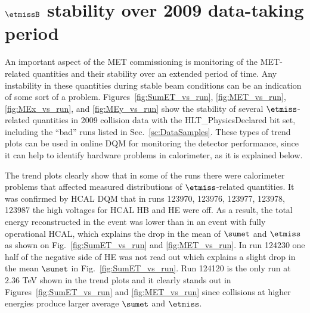 \section[$\etmiss$ stability over 2009 data-taking period]{$\etmissB$ stability over 2009 data-taking period}
\label{sc:METStab}

An important aspect of the MET commissioning is monitoring of the
MET-related quantities and their stability over an extended period of
time. Any instability in these quantities during stable beam conditions
can be an indication of some sort of a problem.
Figures~\ref{fig:SumET_vs_run}, \ref{fig:MET_vs_run},
\ref{fig:MEx_vs_run}, and \ref{fig:MEy_vs_run} show the stability of
several $\etmiss$-related quantities in 2009 collision data with the
HLT\_PhysicsDeclared bit set, including the ``bad'' runs listed in
Sec.~\ref{sc:DataSamples}. These types of trend plots can be used in online DQM
for monitoring the detector performance, since it can help to identify
hardware problems in calorimeter, as it is explained below.

The trend plots clearly show that in some of the runs there
were calorimeter problems that affected measured distributions 
of $\etmiss$-related quantities. It was
confirmed by HCAL DQM that in runs 123970, 123976, 123977,
123978, 123987 the high voltages for HCAL HB and HE were off. As
a result, the total energy reconstructed in the event was lower than in
an event with fully operational HCAL, which explains the drop in
the mean of $\sumet$ and $\etmiss$ as shown on
Fig.~\ref{fig:SumET_vs_run} and \ref{fig:MET_vs_run}. 
In run 124230 one half of the negative side of HE was not read out which
explains a slight drop in the mean $\sumet$ in Fig.~\ref{fig:SumET_vs_run}.
Run 124120 is the only run at $2.36$ TeV shown in the trend plots and it clearly stands out in
Figures~\ref{fig:SumET_vs_run} and \ref{fig:MET_vs_run} since collisions at higher energies
produce larger average $\sumet$ and $\etmiss$.

